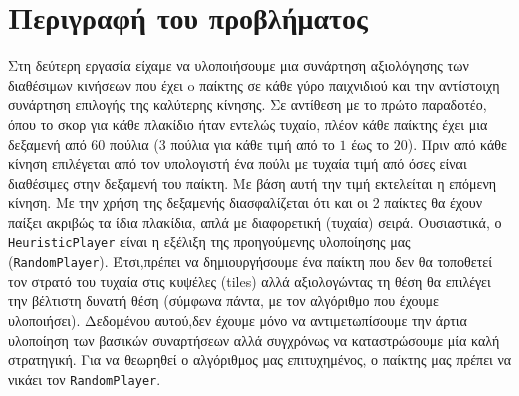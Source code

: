 \chapter{Περιγραφή του προβλήματος}
Στη δεύτερη εργασία είχαμε να υλοποιήσουμε μια συνάρτηση αξιολόγησης των διαθέσιμων
κινήσεων που έχει o παίκτης σε κάθε γύρο παιχνιδιού και την αντίστοιχη συνάρτηση
επιλογής της καλύτερης κίνησης.
Σε αντίθεση με το πρώτο παραδοτέο, όπου το σκορ για
κάθε πλακίδιο ήταν εντελώς τυχαίο, πλέον κάθε παίκτης έχει μια δεξαμενή από $60$ πούλια
(3 πούλια για κάθε τιμή από το $1$ έως το $20$).
Πριν από κάθε κίνηση επιλέγεται από τον υπολογιστή ένα πούλι με τυχαία τιμή από όσες είναι διαθέσιμες στην δεξαμενή του παίκτη.
Με βάση αυτή την τιμή εκτελείται η επόμενη κίνηση.
Με την χρήση της δεξαμενής διασφαλίζεται ότι και οι 2 παίκτες θα έχουν παίξει ακριβώς τα ίδια πλακίδια, απλά με διαφορετική (τυχαία) σειρά.
Ουσιαστικά, ο \lstinline!HeuristicPlayer! είναι η εξέλιξη της
προηγούμενης υλοποίησης μας (\lstinline!RandomPlayer!).
Έτσι,πρέπει να δημιουργήσουμε ένα παίκτη που δεν θα τοποθετεί τον στρατό του τυχαία στις κυψέλες (tiles)
αλλά αξιολογώντας τη θέση θα επιλέγει την βέλτιστη δυνατή θέση (σύμφωνα πάντα,
με τον αλγόριθμο που έχουμε υλοποιήσει).
Δεδομένου αυτού,δεν έχουμε μόνο να αντιμετωπίσουμε την άρτια υλοποίηση
των βασικών συναρτήσεων αλλά συγχρόνως να καταστρώσουμε μία καλή στρατηγική.
Για να θεωρηθεί ο αλγόριθμος μας επιτυχημένος, ο παίκτης μας πρέπει να νικάει τον
\lstinline!RandomPlayer!.

